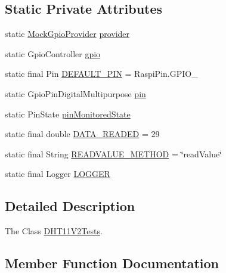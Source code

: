 \subsection*{Static Private Attributes}
\begin{DoxyCompactItemize}
\item 
static \hyperlink{classcom_1_1libsensorj_1_1mock_1_1MockGpioProvider}{Mock\+Gpio\+Provider} \hyperlink{classcom_1_1libsensorj_1_1concretesensor_1_1test_1_1DHT11V2Tests_a7aed1b77856a182c560a5c52da10cf65}{provider}
\item 
static Gpio\+Controller \hyperlink{classcom_1_1libsensorj_1_1concretesensor_1_1test_1_1DHT11V2Tests_ae5c9d1dedf6054de462c9d095738ea44}{gpio}
\item 
static final Pin \hyperlink{classcom_1_1libsensorj_1_1concretesensor_1_1test_1_1DHT11V2Tests_abd7cafe649b501cdc471e939e171b7db}{D\+E\+F\+A\+U\+L\+T\+\_\+\+P\+I\+N} = Raspi\+Pin.\+G\+P\+I\+O\+\_
\item 
static Gpio\+Pin\+Digital\+Multipurpose \hyperlink{classcom_1_1libsensorj_1_1concretesensor_1_1test_1_1DHT11V2Tests_a4bb6a57ac9ed185e3afc96371eff0d0e}{pin}
\item 
static Pin\+State \hyperlink{classcom_1_1libsensorj_1_1concretesensor_1_1test_1_1DHT11V2Tests_a85488d302d4cba874540ea6a2fe4f33d}{pin\+Monitored\+State}
\item 
static final double \hyperlink{classcom_1_1libsensorj_1_1concretesensor_1_1test_1_1DHT11V2Tests_afc8cc65c4037d051374f23ea53ab13f6}{D\+A\+T\+A\+\_\+\+R\+E\+A\+D\+E\+D} = 29
\item 
static final String \hyperlink{classcom_1_1libsensorj_1_1concretesensor_1_1test_1_1DHT11V2Tests_a0876151246714e9010ff4d00df631b7d}{R\+E\+A\+D\+V\+A\+L\+U\+E\+\_\+\+M\+E\+T\+H\+O\+D} = \char`\"{}read\+Value\char`\"{}
\item 
static final Logger \hyperlink{classcom_1_1libsensorj_1_1concretesensor_1_1test_1_1DHT11V2Tests_a7b0ae4046877e2b36c93263c684e394e}{L\+O\+G\+G\+E\+R}
\end{DoxyCompactItemize}


\subsection{Detailed Description}
The Class \hyperlink{classcom_1_1libsensorj_1_1concretesensor_1_1test_1_1DHT11V2Tests}{D\+H\+T11\+V2\+Tests}. 

\subsection{Member Function Documentation}
\hypertarget{classcom_1_1libsensorj_1_1concretesensor_1_1test_1_1DHT11V2Tests_a2993801bfd9837ef100800fcaa63dfea}{}
